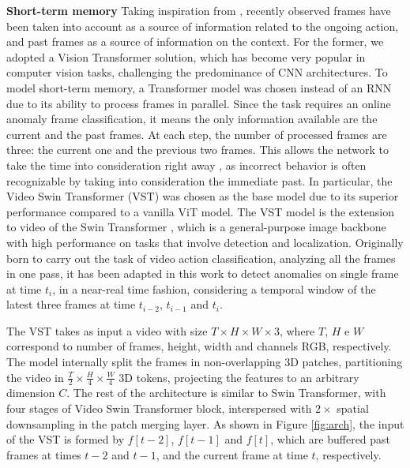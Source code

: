 \noindent\textbf{Short-term memory}
Taking inspiration from \cite{xu2021long}, recently observed frames have been taken into account as a source of information related to the ongoing action, and past frames as a source of information on the context.
For the former, we adopted a Vision Transformer \cite{DBLP:conf/iclr/DosovitskiyB0WZ21} solution, which has become very popular in computer vision tasks, challenging the predominance of CNN architectures.
To model short-term memory, a Transformer model was chosen instead of an RNN due to its ability to process frames in parallel.
Since the task requires an online anomaly frame classification, it means the only information available are the current and the past frames.
At each step, the number of processed frames are three: the current one and the previous two frames.
This allows the network to take the time into consideration right away , as incorrect behavior is often recognizable by taking into consideration the immediate past.
In particular, the Video Swin Transformer (VST) \cite{liu_video_2022} was chosen as the base model due to its superior performance compared to a vanilla ViT \cite{DBLP:conf/iclr/DosovitskiyB0WZ21} model.
The VST model is the extension to video of the Swin Transformer \cite{liu2021Swin}, which is a general-purpose image backbone with high performance on tasks that involve detection and localization.
Originally born to carry out the task of video action classification, analyzing all the frames in one pass, it has been adapted in this work to detect anomalies on single frame at time $t_{i}$, in a near-real time fashion, considering a temporal window of the latest three frames at time $t_{i-2}$, $t_{i-1}$ and $t_{i}$.

The VST takes as input a video with size $T \times H \times W \times 3$, where $T$, $H$ e $W$ correspond to number of frames, height, width and channels RGB, respectively.
The model internally split the frames in non-overlapping 3D patches, partitioning the video in $\frac{T}{2} \times \frac{H}{4} \times \frac{W}{4}$ 3D tokens, projecting the features to an arbitrary dimension $C$.
The rest of the architecture is similar to Swin Transformer, with four stages of Video Swin Transformer block, interspersed with $2\times$ spatial downsampling in the patch merging layer.
As shown in Figure \ref{fig:arch}, the input of the VST is formed by $f[t-2]$, $f[t-1]$ and $f[t]$, which are buffered past frames at times $t-2$ and $t-1$, and the current frame at time $t$, respectively.

